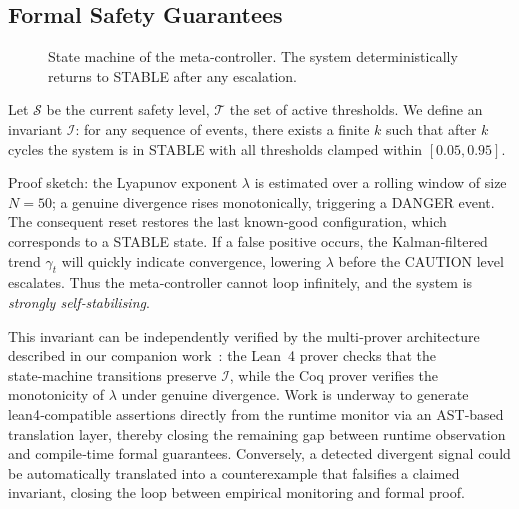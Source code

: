 \subsection{Formal Safety Guarantees}
\begin{figure}[htbp]
\centering
{}
\caption{State machine of the meta‑controller.  The system deterministically returns to STABLE after any escalation.}
\label{fig:statemachine}
\end{figure}

Let $\mathcal{S}$ be the current safety level, $\mathcal{T}$ the set of
active thresholds.  We define an invariant $\mathcal{I}$: for any sequence
of events, there exists a finite $k$ such that after $k$ cycles the system
is in STABLE with all thresholds clamped within $[0.05,0.95]$.

Proof sketch: the Lyapunov exponent $\lambda$ is estimated over a rolling
window of size $N=50$; a genuine divergence rises monotonically, triggering
a DANGER event.  The consequent reset restores the last known‑good
configuration, which corresponds to a STABLE state.  If a false positive
occurs, the Kalman‑filtered trend $\gamma_t$ will quickly indicate
convergence, lowering $\lambda$ before the CAUTION level escalates.
Thus the meta‑controller cannot loop infinitely, and the system is
\emph{strongly self‑stabilising}.

This invariant can be independently verified by the multi‑prover
architecture described in our companion work~\cite{beniers2026multi}:
the Lean~4 prover checks that the state‑machine transitions preserve
$\mathcal{I}$, while the Coq prover verifies the monotonicity of $\lambda$
under genuine divergence.  Work is underway to generate lean4‑compatible
assertions directly from the runtime monitor via an AST‑based translation
layer, thereby closing the remaining gap between runtime observation and
compile‑time formal guarantees.
Conversely, a detected divergent signal could be automatically
translated into a counterexample that falsifies a claimed invariant,
closing the loop between empirical monitoring and formal proof.


